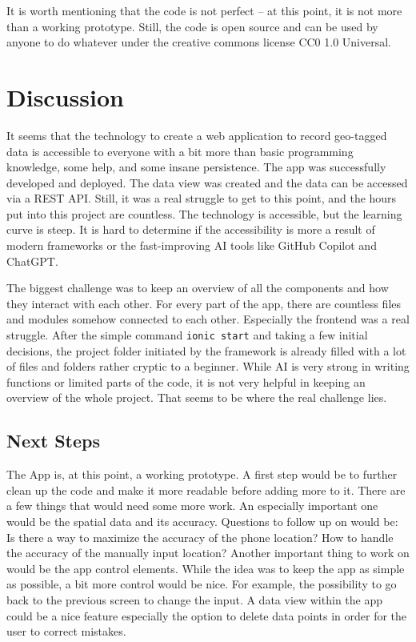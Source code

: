 \documentclass{josis}
\begin{document}
It is worth mentioning that the code is not perfect -- at this point, it is not more than a working prototype. Still, the code is open source and can
be used by anyone to do whatever under the creative commons license CC0 1.0 Universal.

\section{Discussion}

It seems that the technology to create a web application to record geo-tagged data is accessible to everyone with a bit more than basic programming knowledge,
some help, and some insane persistence. The app was successfully developed and deployed. The data view was created and the data can be accessed via a REST API.
Still, it was a real struggle to get to this point, and the hours put into this project are countless. The technology is accessible, but the learning curve is steep.
It is hard to determine if the accessibility is more a result of modern frameworks or the fast-improving AI tools like GitHub Copilot and ChatGPT.

The biggest challenge was to keep an overview of all the components and how they interact with each other. For every part of the app, there are countless
files and modules somehow connected to each other. Especially the frontend was a real struggle. After the simple command \texttt{ionic start} and
taking a few initial decisions, the project folder initiated by the framework is already filled with a lot of files and folders rather cryptic to a beginner. While AI is
very strong in writing functions or limited parts of the code, it is not very helpful in keeping an overview of the whole project.
That seems to be where the real challenge lies.

\subsection{Next Steps}

The App is, at this point, a working prototype. A first step would be to further clean up the code and make it more readable before adding more to it.
There are a few things that would need some more work. An especially important one would be the spatial data and its accuracy.
Questions to follow up on would be: Is there a way to maximize the accuracy of the phone location? 
How to handle the accuracy of the manually input location?
Another important thing to work on would be the app control elements. While the idea was to keep the app as simple as possible,
a bit more control would be nice. For example, the possibility to go back to the previous screen to change the input.
A data view within the app could be a nice feature especially the option to delete data points
in order for the user to correct mistakes.
\end{document}
